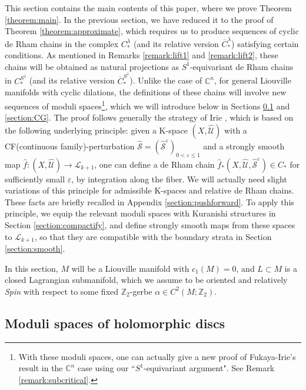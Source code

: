 \documentclass[a4paper]{article}
\numberwithin{equation}{section}
\begin{document}
This section contains the main contents of this paper, where we prove Theorem \ref{theorem:main}. In the previous section, we have reduced it to the proof of Theorem \ref{theorem:approximate}, which requires us to produce sequences of cyclic de Rham chains in the complex $C_\ast^\lambda$ (and its relative version $\overline{C}_\ast^\lambda$) satisfying certain conditions. As mentioned in Remarks \ref{remark:lift1} and \ref{remark:lift2}, these chains will be obtained as natural projections as $S^1$-equivariant de Rham chains in $C_\ast^{S^1}$ (and its relative version $\overline{C}_\ast^{S^1}$). Unlike the case of $\mathbb{C}^n$, for general Liouville manifolds with cyclic dilations, the definitions of these chains will involve new sequences of moduli spaces\footnote{With these moduli spaces, one can actually give a new proof of Fukaya-Irie's result in the $\mathbb{C}^n$ case using our ``$S^1$-equivariant argument". See Remark \ref{remark:subcritical}.}, which we will introduce below in Sections \ref{section:disc} and \ref{section:CG}. The proof follows generally the strategy of Irie \cite{ki2}, which is based on the following underlying principle: given a K-space $(X,\widehat{\mathcal{U}})$ with a CF(continuous family)-perturbation $\widehat{\mathcal{S}}=(\widehat{\mathcal{S}}^\varepsilon)_{0<\varepsilon\leq1}$ and a strongly smooth map $\hat{f}:(X,\widehat{\mathcal{U}})\rightarrow\mathcal{L}_{k+1}$, one can define a de Rham chain $\hat{f}_\ast(X,\widehat{\mathcal{U}},\widehat{\mathcal{S}}^\varepsilon)\in C_\ast$ for sufficiently small $\varepsilon$, by integration along the fiber. We will actually need slight variations of this principle for admissible K-spaces and relative de Rham chains. These facts are briefly recalled in Appendix \ref{section:pushforward}. To apply this principle, we equip the relevant moduli spaces with Kuranishi structures in Section \ref{section:compactify}, and define strongly smooth maps from these spaces to $\mathcal{L}_{k+1}$, so that they are compatible with the boundary strata in Section \ref{section:smooth}.

In this section, $M$ will be a Liouville manifold with $c_1(M)=0$, and $L\subset M$ is a closed Lagrangian submanifold, which we assume to be oriented and relatively \textit{Spin} with respect to some fixed $\mathbb{Z}_2$-gerbe $\alpha\in C^2(M;\mathbb{Z}_2)$. 

\subsection{Moduli spaces of holomorphic discs}\label{section:disc}
\end{document}
